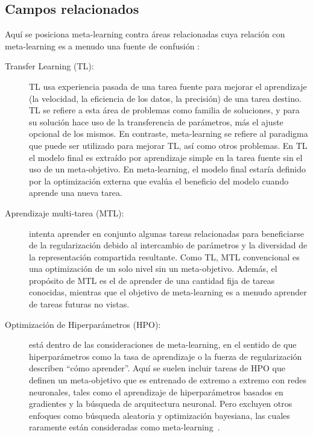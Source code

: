 \subsection{Campos relacionados}\label{subsec:meta-related-fields}

Aquí se posiciona meta-learning contra áreas relacionadas cuya relación con
meta-learning es a menudo una fuente de confusión
:

\begin{description}
	\item[Transfer Learning (TL):] TL usa experiencia pasada de una tarea
    fuente para mejorar el aprendizaje (la velocidad, la eficiencia de los
    datos, la precisión) de una tarea destino. TL se refiere a esta área de
    problemas como familia de soluciones, y para su solución hace uso de la
    transferencia de parámetros, más el ajuste opcional de los mismos. En
    contraste, meta-learning se refiere al paradigma que puede ser utilizado
    para mejorar TL, así como otros problemas. En TL el modelo final es
    extraído por aprendizaje simple en la tarea fuente sin el uso de un
    meta-objetivo. En meta-learning, el modelo final estaría definido por la
    optimización externa que evalúa el beneficio del modelo cuando aprende una
    nueva tarea.
	
	\item[Aprendizaje multi-tarea (MTL):] intenta aprender en conjunto algunas
    tareas relacionadas para beneficiarse de la regularización debido al
    intercambio de parámetros y la diversidad de la representación compartida
    resultante. Como TL, MTL convencional es una optimización de un solo nivel
    sin un meta-objetivo. Además, el propósito de MTL es el de aprender de una
    cantidad fija de tareas conocidas, mientras que el objetivo de
    meta-learning es a menudo aprender de tareas futuras no vistas.
	 
	\item[Optimización de Hiperparámetros (HPO):] está dentro de las
    consideraciones de meta-learning, en el sentido de que hiperparámetros como
    la tasa de aprendizaje o la fuerza de regularización describen
    ``cómo aprender''. Aquí se suelen incluir tareas de HPO que definen un
    meta-objetivo que es entrenado de extremo a extremo con redes neuronales,
    tales como el aprendizaje de hiperparámetros basados en gradientes y la
    búsqueda de arquitectura neuronal. Pero excluyen otros enfoques como
    búsqueda aleatoria y optimización bayesiana, las cuales raramente están
    consideradas como meta-learning~.
	

\end{description}
